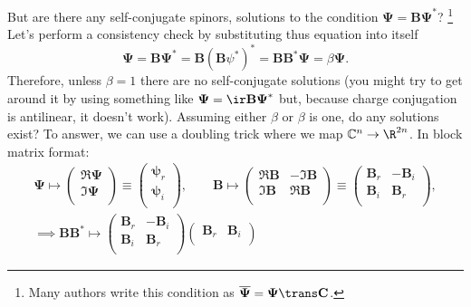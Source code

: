 \documentclass[11pt]{article}
\newcommand{\cc}{^\ast}
\newcommand{\B}{\mathbf{B}}
\renewcommand{\C}{\mathbf{C}}
\newcommand{\Cb}{\mathbb{C}}
\newcommand{\psib}{\boldsymbol{\psi}}
\newcommand{\Psib}{\boldsymbol{\Psi}}
\begin{document}
But are there any self-conjugate spinors, \ie solutions to the condition \( \Psib = \B \Psib\cc \)?%
\footnote{Many authors write this condition as \( \overline{\Psib} = \Psib\trans \C \).}
Let's perform a consistency  check by substituting thus equation into itself
%
\begin{equation*}
  \Psib = \B \Psib\cc = \B (\B \psi\cc)\cc = \B \B\cc \Psib = \beta \Psib.
\end{equation*}
%
Therefore, unless \(\beta = 1\) there are no self-conjugate solutions
(you might try to get around it by using something like \( \Psib = \ir \B \Psib\cc \) but, because charge conjugation is antilinear, it doesn't work).
Assuming either \(\beta\) or \(\beta\) is one, do any solutions exist?
To answer, we can use a doubling trick where we map \(\Cb^n \to \R^{2n}\).
In block matrix format:
%
\begin{equation*}
\begin{gathered}
  \Psib \longmapsto
            \begin{pmatrix}
              \Re \Psib \\
              \Im \Psib \\
            \end{pmatrix}
  \equiv    \begin{pmatrix}
              \psib_r \\
              \psib_i \\
            \end{pmatrix}
  , \qquad
  \B \longmapsto 
        \begin{pmatrix}
          \Re \B & -\Im \B \\
          \Im \B &  \Re \B \\
        \end{pmatrix}
  \equiv \begin{pmatrix}
           \B_r & -\B_i \\
           \B_i &  \B_r \\
         \end{pmatrix}
  , \\
  \implies
  \B \B\cc \longmapsto
         \begin{pmatrix}
           \B_r & -\B_i \\
           \B_i &  \B_r \\
         \end{pmatrix}
         \begin{pmatrix}
            \B_r & \B_i \\

\end{pmatrix}
\end{gathered}
\end{equation*}
\end{document}
